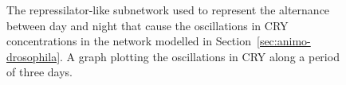 \begin{figure}[!htb]
\begin{minipage}{\textwidth}
  \centering
  \qquad
\caption{{\bf \protect{}} The repressilator-like subnetwork used to represent the alternance
between day and night that cause the oscillations in {\sf CRY} concentrations in the
network modelled in Section~\ref{sec:animo-drosophila}.
{\bf \protect{}} A graph plotting the oscillations in {\sf CRY} along
a period of three days.}\label{fig:repressilator}
\end{minipage}
\end{figure}



